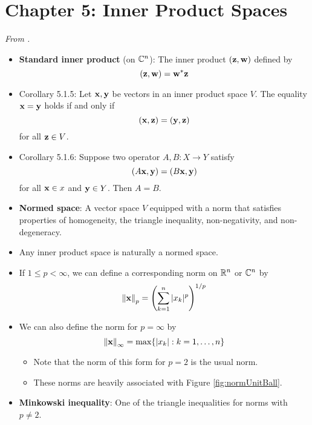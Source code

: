 \documentclass[../../notes.tex]{subfiles}
\begin{document}
\section{Chapter 5: Inner Product Spaces}
\emph{From \textcite{bib:Treil}.}
\begin{itemize}
    \item {}\textbf{Standard inner product} (on $\mathbb{C}^n$): The inner product $(\mathbf{z},\mathbf{w})$ defined by
    \begin{equation*}
        (\mathbf{z},\mathbf{w}) = \mathbf{w}^*\mathbf{z}
    \end{equation*}
    \item Corollary 5.1.5: Let $\mathbf{x},\mathbf{y}$ be vectors in an inner product space $V$. The equality $\mathbf{x}=\mathbf{y}$ holds if and only if
    \begin{equation*}
        (\mathbf{x},\mathbf{z}) = (\mathbf{y},\mathbf{z})
    \end{equation*}
    for all $\mathbf{z}\in V$.
    \item Corollary 5.1.6: Suppose two operator $A,B:X\to Y$ satisfy
    \begin{equation*}
        (A\mathbf{x},\mathbf{y}) = (B\mathbf{x},\mathbf{y})
    \end{equation*}
    for all $\mathbf{x}\in x$ and $\mathbf{y}\in Y$. Then $A=B$.
    \item \textbf{Normed space}: A vector space $V$ equipped with a norm that satisfies properties of homogeneity, the triangle inequality, non-negativity, and non-degeneracy.
    \item Any inner product space is naturally a normed space.
    \item If $1\leq p<\infty$, we can define a corresponding norm on $\mathbb{R}^n$ or $\mathbb{C}^n$ by
    \begin{equation*}
        \norm{\mathbf{x}}_p = \left( \sum_{k=1}^n|x_k|^p \right)^{1/p}
    \end{equation*}
    \item We can also define the norm for $p=\infty$ by
    \begin{equation*}
        \norm{\mathbf{x}}_\infty = \max\{|x_k|:k=1,\dots,n\}
    \end{equation*}
    \begin{itemize}
        \item Note that the norm of this form for $p=2$ is the usual norm.
        \item These norms are heavily associated with Figure \ref{fig:normUnitBall}.
    \end{itemize}
    \item \textbf{Minkowski inequality}: One of the triangle inequalities for norms with $p\neq 2$.

\end{itemize}
\end{document}
